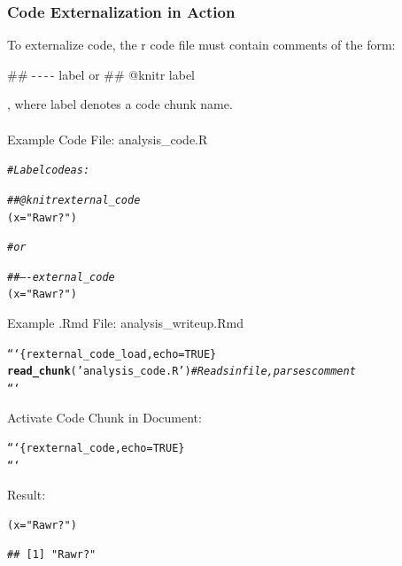 \documentclass{beamer}\usepackage[]{graphicx}\usepackage[]{color}
\makeatletter
\newcommand{\hlstr}[1]{\textcolor[rgb]{0.192,0.494,0.8}{#1}}%
\newcommand{\hlcom}[1]{\textcolor[rgb]{0.678,0.584,0.686}{\textit{#1}}}%
\newcommand{\hlstd}[1]{\textcolor[rgb]{0.345,0.345,0.345}{#1}}%
\newcommand{\hlkwb}[1]{\textcolor[rgb]{0.69,0.353,0.396}{#1}}%
\newcommand{\hlkwd}[1]{\textcolor[rgb]{0.737,0.353,0.396}{\textbf{#1}}}%
\newenvironment{kframe}{%
 \def\at@end@of@kframe{}%
 \ifinner\ifhmode%
  \def\at@end@of@kframe{\end{minipage}}%
  \begin{minipage}{\columnwidth}%
 \fi\fi%
 \def\FrameCommand##1{\hskip\@totalleftmargin \hskip-\fboxsep
 \colorbox{shadecolor}{##1}\hskip-\fboxsep
     \hskip-\linewidth \hskip-\@totalleftmargin \hskip\columnwidth}%
 \MakeFramed {\advance\hsize-\width
   \@totalleftmargin\z@ \linewidth\hsize
   \@setminipage}}%
 {\par\unskip\endMakeFramed%
 \at@end@of@kframe}
\newenvironment{knitrout}{}{} %
\makeatother
\begin{document}
\begin{frame}[fragile]
\frametitle{Code Externalization in Action}
To externalize code, the r code file must contain comments of the form:
\begin{center}\#\# -\,-\,-\,- label or \#\# @knitr label\end{center}, where label denotes a code chunk name.
\\$ $\\
Example Code File: analysis\_code.R
\begin{knitrout}
\color{fgcolor}\begin{kframe}
\begin{alltt}
\hlcom{# Label code as:}

\hlcom{## @knitr external_code}
\hlstd{(x} \hlkwb{=} \hlstr{"Rawr?"}\hlstd{)}

\hlcom{# or }

\hlcom{## ---- external_code}
\hlstd{(x} \hlkwb{=} \hlstr{"Rawr?"}\hlstd{)}
\end{alltt}
\end{kframe}
\end{knitrout}
\end{frame}

\begin{frame}[fragile]
Example .Rmd File: analysis\_writeup.Rmd
\begin{knitrout}
\color{fgcolor}\begin{kframe}
\begin{alltt}
```\{r external_code_load, echo=TRUE\}
\hlkwd{read_chunk}(\hlstr{'analysis_code.R'}) \hlcom{# Reads in file, parses comment}
```
\end{alltt}
\end{kframe}
\end{knitrout}

Activate Code Chunk in Document:
\begin{knitrout}
\color{fgcolor}\begin{kframe}
\begin{alltt}
```\{r external_code, echo=TRUE\}
```
\end{alltt}
\end{kframe}
\end{knitrout}

Result:
\begin{knitrout}
\color{fgcolor}\begin{kframe}
\begin{alltt}
\hlstd{(x} \hlkwb{=} \hlstr{"Rawr?"}\hlstd{)}
\end{alltt}
\begin{verbatim}
## [1] "Rawr?"
\end{verbatim}
\end{kframe}
\end{knitrout}
\end{frame}
\end{document}
